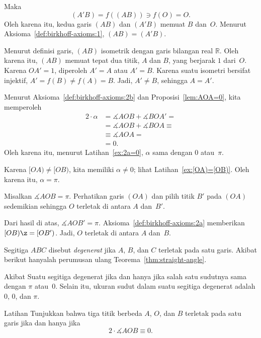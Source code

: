 Maka 
\[(A'B)=f((AB))\ni f(O)=O.\]
Oleh karena itu, kedua garis $(AB)$ dan $(A'B)$ memuat $B$ dan~$O$.
Menurut Aksioma~\ref{def:birkhoff-axioms:1}, $(AB)=(A'B)$.

Menurut definisi garis, $(AB)$ isometrik dengan garis bilangan real $\mathbb{R}$.
Oleh karena itu, $(AB)$ memuat tepat dua titik, $A$ dan $B$, yang berjarak $1$ dari~$O$.
Karena $OA' = 1$, diperoleh $A' = A$ atau $A' = B$.
Karena suatu isometri bersifat injektif, $A' = f(B) \ne f(A) = B$.
Jadi, $A' \ne B$, sehingga $A = A'$.

Menurut Aksioma~\ref{def:birkhoff-axioms:2b} dan Proposisi~\ref{lem:AOA=0}, kita memperoleh
\begin{align*}
2\cdot\alpha&=
\measuredangle AOB+\measuredangle BOA'=
\\
&=\measuredangle AOB+\measuredangle BOA\equiv
\\
&\equiv\measuredangle AOA=
\\
&= 0.
\end{align*}
Oleh karena itu, menurut Latihan~\ref{ex:2a=0}, $\alpha$ sama dengan $0$ atau~$\pi$.

Karena $[OA)\ne [OB)$,  
kita memiliki $\alpha\ne 0$; lihat Latihan~\ref{ex:[OA)=[OB)}.
Oleh karena itu, $\alpha=\pi$.


Misalkan $\measuredangle A O B= \pi$.
Perhatikan garis $(OA)$ dan pilih titik $B'$ pada $(OA)$ sedemikian sehingga $O$ terletak di antara $A$ dan~$B'$.

Dari hasil di atas, $\measuredangle AOB'=\pi$.
Aksioma~\ref{def:birkhoff-axioms:2a} memberikan $[O B)\z=[O B')$.
Jadi, $O$ terletak di antara $A$ dan~$B$.
\qeds 

Segitiga $ABC$ disebut 
\emph{degenerat}
jika $A$, $B$, dan $C$ terletak pada satu garis.
Akibat berikut hanyalah perumusan ulang Teorema~\ref{thm:straight-angle}.

\begin{thm}[\abs]{Akibat}\label{cor:degenerate=pi}
Suatu segitiga degenerat jika dan hanya jika salah satu sudutnya sama dengan $\pi$ atau~$0$.
Selain itu, ukuran sudut dalam suatu segitiga degenerat adalah $0$, $0$, dan $\pi$.
\end{thm}

\begin{thm}{Latihan}\label{ex:lineAOB}
Tunjukkan bahwa tiga titik berbeda $A$, $O$, dan $B$ terletak pada satu garis jika dan hanya jika 
$$2\cdot \measuredangle AOB\equiv 0.$$ 

\end{thm}

